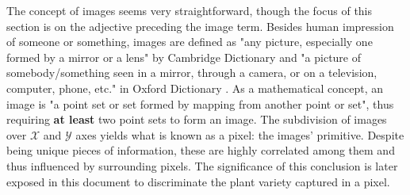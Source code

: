 The concept of images seems very straightforward, though the focus of this section is on the adjective preceding the image term. Besides human impression of someone or something, images are defined as "any picture, especially one formed by a mirror or a lens" by Cambridge Dictionary \cite{cambridge_english_dictionary_cambridge_2023} and "a picture of somebody/something seen in a mirror, through a camera, or on a television, computer, phone, etc." in Oxford Dictionary \cite{oxford_university_press_oxford_2023}. As a mathematical concept, an image is "a point set or set formed by mapping from another point or set", thus requiring \textbf{at least} two point sets to form an image. The subdivision of images over $\mathcal{X}$ and $\mathcal{Y}$ axes yields what is known as a pixel: the images' primitive. Despite being unique pieces of information, these are highly correlated among them and thus influenced by surrounding pixels. The significance of this conclusion is later exposed in this document to discriminate the plant variety captured in a pixel.

